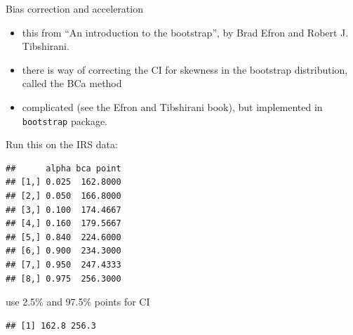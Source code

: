 \documentclass[
  ignorenonframetext,
]{beamer}
\newenvironment{Shaded}{\begin{snugshade}}{\end{snugshade}}
\newcommand{\DataTypeTok}[1]{\textcolor[rgb]{0.13,0.29,0.53}{#1}}
\newcommand{\DecValTok}[1]{\textcolor[rgb]{0.00,0.00,0.81}{#1}}
\newcommand{\FloatTok}[1]{\textcolor[rgb]{0.00,0.00,0.81}{#1}}
\newcommand{\KeywordTok}[1]{\textcolor[rgb]{0.13,0.29,0.53}{\textbf{#1}}}
\newcommand{\NormalTok}[1]{#1}
\newcommand{\OperatorTok}[1]{\textcolor[rgb]{0.81,0.36,0.00}{\textbf{#1}}}
\newcommand{\StringTok}[1]{\textcolor[rgb]{0.31,0.60,0.02}{#1}}
\providecommand{\tightlist}{%
  \setlength{\itemsep}{0pt}\setlength{\parskip}{0pt}}
\begin{document}
\begin{frame}[fragile]{Bias correction and acceleration}
\protect\hypertarget{bias-correction-and-acceleration}{}

\begin{itemize}
\tightlist
\item
  this from ``An introduction to the bootstrap'', by Brad Efron and
  Robert J. Tibshirani.
\item
  there is way of correcting the CI for skewness in the bootstrap
  distribution, called the BCa method
\item
  complicated (see the Efron and Tibshirani book), but implemented in
  \texttt{bootstrap} package.
\end{itemize}

\end{frame}

\begin{frame}[fragile]{Run this on the IRS data:}
\protect\hypertarget{run-this-on-the-irs-data}{}

\begin{Shaded}
\end{Shaded}

\begin{verbatim}
##      alpha bca point
## [1,] 0.025  162.8000
## [2,] 0.050  166.8000
## [3,] 0.100  174.4667
## [4,] 0.160  179.5667
## [5,] 0.840  224.6000
## [6,] 0.900  234.3000
## [7,] 0.950  247.4333
## [8,] 0.975  256.3000
\end{verbatim}

\end{frame}

\begin{frame}[fragile]{use 2.5\% and 97.5\% points for CI}
\protect\hypertarget{use-2.5-and-97.5-points-for-ci}{}

\begin{Shaded}
\end{Shaded}

\begin{verbatim}
## [1] 162.8 256.3
\end{verbatim}

\end{frame}
\end{document}
